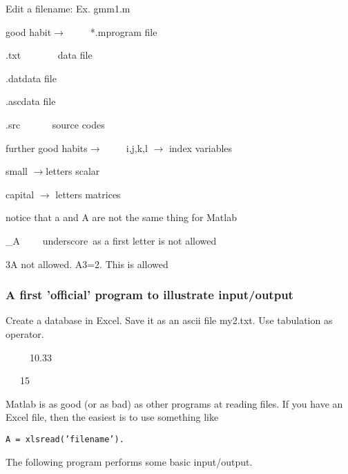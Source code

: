 \documentclass[12pt,a4paper]{article}
\begin{document}
Edit a filename: Ex. gmm1.m

good habit$\rightarrow \qquad $\ *.m\qquad \qquad program file\qquad

\qquad \qquad \qquad \qquad *.txt \ \ \ \ \ \ \ \qquad data file

\qquad \qquad \qquad \qquad *.dat\qquad \qquad data file

\qquad \qquad \qquad \qquad *.asc\qquad \qquad data file

\qquad \qquad \qquad \qquad *.src \qquad\ \ \ \ \ \ source codes

\bigskip

further good habits$\rightarrow \qquad \ \ $i,j,k,l $\rightarrow $ index
variables

\qquad \qquad \qquad \qquad \qquad \qquad small $\rightarrow $letters scalar

\qquad \qquad \qquad \qquad \qquad \qquad capital $\rightarrow $ letters
matrices

notice that a and A are not the same thing for Matlab

\_A \ \ \ \ underscore\ as a first letter is not allowed

3A not allowed. A3=2. This is allowed

\bigskip

\subsubsection{A first 'official' program to illustrate input/output}

Create a database in Excel. Save it as an ascii file my2.txt. Use tabulation
as operator.

{\small \qquad {}}

{\small \qquad {}}

{\small \qquad {} }

{\small \qquad {}}

{\small \qquad {} \ \ \ \ \ 10.33}

{\small \qquad {} \ \ \ 15}

\bigskip

Matlab is as good (or as bad) as other programs at reading files. If you
have an Excel file, then the easiest is to use something like

\texttt{A = xlsread('filename').}

\bigskip The following program performs some basic input/output.
\end{document}
